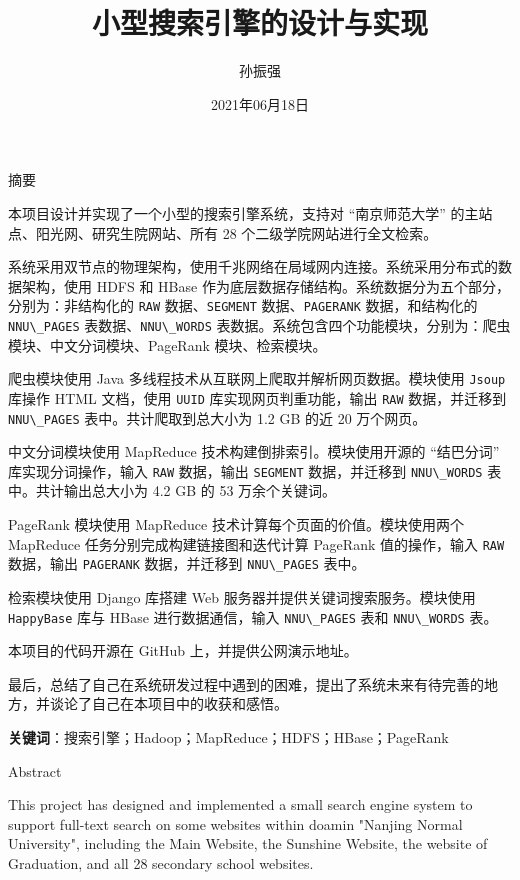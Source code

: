 \documentclass{ctexart}
\title{小型搜索引擎的设计与实现}
\author{孙振强}
\date{2021年06月18日}
\newcommand{\code}[1]{\colorbox{backcolor}{\lstinline|#1|}}
\begin{document}
    \maketitle
    \newpage

    \begin{center}
        \LARGE 摘要
    \end{center}

    本项目设计并实现了一个小型的搜索引擎系统，支持对 “南京师范大学” 的主站点、阳光网、研究生院网站、所有 28 个二级学院网站进行全文检索。

    系统采用双节点的物理架构，使用千兆网络在局域网内连接。系统采用分布式的数据架构，使用 HDFS 和 HBase 作为底层数据存储结构。系统数据分为五个部分，分别为：非结构化的 \code{RAW} 数据、\code{SEGMENT} 数据、\code{PAGERANK} 数据，和结构化的 \code{NNU\_PAGES} 表数据、\code{NNU\_WORDS} 表数据。系统包含四个功能模块，分别为：爬虫模块、中文分词模块、PageRank 模块、检索模块。

    爬虫模块使用 Java 多线程技术从互联网上爬取并解析网页数据。模块使用 \code{Jsoup} 库操作 HTML 文档，使用 \code{UUID} 库实现网页判重功能，输出 \code{RAW} 数据，并迁移到 \code{NNU\_PAGES} 表中。共计爬取到总大小为 1.2 GB 的近 20 万个网页。

    中文分词模块使用 MapReduce 技术构建倒排索引。模块使用开源的 “结巴分词” 库实现分词操作，输入 \code{RAW} 数据，输出 \code{SEGMENT} 数据，并迁移到 \code{NNU\_WORDS} 表中。共计输出总大小为 4.2 GB 的 53 万余个关键词。

    PageRank 模块使用 MapReduce 技术计算每个页面的价值。模块使用两个 MapReduce 任务分别完成构建链接图和迭代计算 PageRank 值的操作，输入 \code{RAW} 数据，输出 \code{PAGERANK} 数据，并迁移到 \code{NNU\_PAGES} 表中。

    检索模块使用 Django 库搭建 Web 服务器并提供关键词搜索服务。模块使用 \code{HappyBase} 库与 HBase 进行数据通信，输入 \code{NNU\_PAGES} 表和 \code{NNU\_WORDS} 表。

    本项目的代码开源在 GitHub 上，并提供公网演示地址。

    最后，总结了自己在系统研发过程中遇到的困难，提出了系统未来有待完善的地方，并谈论了自己在本项目中的收获和感悟。

    \textbf{关键词}：搜索引擎；Hadoop；MapReduce；HDFS；HBase；PageRank

    \newpage

    \begin{center}
        \LARGE Abstract
    \end{center}

    This project has designed and implemented a small search engine system to support full-text search on some websites within doamin "Nanjing Normal University", including the Main Website, the Sunshine Website, the website of Graduation, and all 28 secondary school websites.
\end{document}
